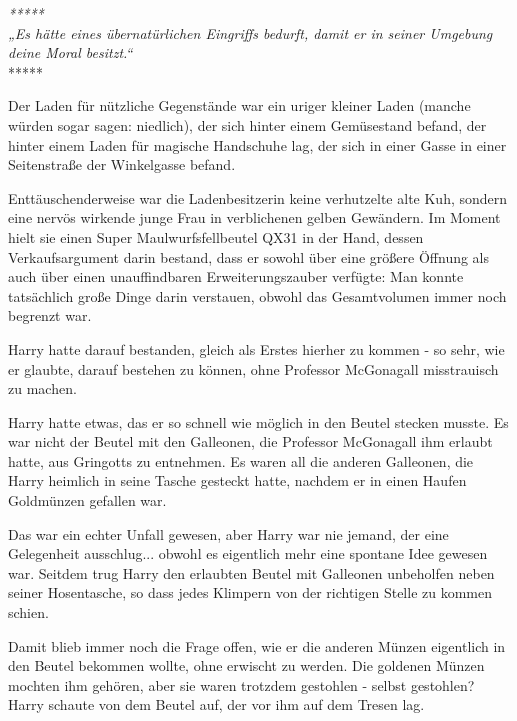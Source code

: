

\hypertarget{der-fundamentale-attributionsfehler}{%

\emph{*****}\\ \emph{„Es hätte eines übernatürlichen Eingriffs bedurft, damit er in seiner Umgebung deine Moral besitzt.“}\\ *****

Der Laden für nützliche Gegenstände war ein uriger kleiner Laden (manche würden sogar sagen: niedlich), der sich hinter einem Gemüsestand befand, der hinter einem Laden für magische Handschuhe lag, der sich in einer Gasse in einer Seitenstraße der Winkelgasse befand.

Enttäuschenderweise war die Ladenbesitzerin keine verhutzelte alte Kuh, sondern eine nervös wirkende junge Frau in verblichenen gelben Gewändern. Im Moment hielt sie einen Super Maulwurfsfellbeutel QX31 in der Hand, dessen Verkaufsargument darin bestand, dass er sowohl über eine größere Öffnung als auch über einen unauffindbaren Erweiterungszauber verfügte: Man konnte tatsächlich große Dinge darin verstauen, obwohl das Gesamtvolumen immer noch begrenzt war.

Harry hatte darauf bestanden, gleich als Erstes hierher zu kommen - so sehr, wie er glaubte, darauf bestehen zu können, ohne Professor McGonagall misstrauisch zu machen.

Harry hatte etwas, das er so schnell wie möglich in den Beutel stecken musste. Es war nicht der Beutel mit den Galleonen, die Professor McGonagall ihm erlaubt hatte, aus Gringotts zu entnehmen. Es waren all die anderen Galleonen, die Harry heimlich in seine Tasche gesteckt hatte, nachdem er in einen Haufen Goldmünzen gefallen war.

Das war ein echter Unfall gewesen, aber Harry war nie jemand, der eine Gelegenheit ausschlug... obwohl es eigentlich mehr eine spontane Idee gewesen war. Seitdem trug Harry den erlaubten Beutel mit Galleonen unbeholfen neben seiner Hosentasche, so dass jedes Klimpern von der richtigen Stelle zu kommen schien.

Damit blieb immer noch die Frage offen, wie er die anderen Münzen eigentlich in den Beutel bekommen wollte, ohne erwischt zu werden. Die goldenen Münzen mochten ihm gehören, aber sie waren trotzdem gestohlen - selbst gestohlen? Harry schaute von dem Beutel auf, der vor ihm auf dem Tresen lag.

}
